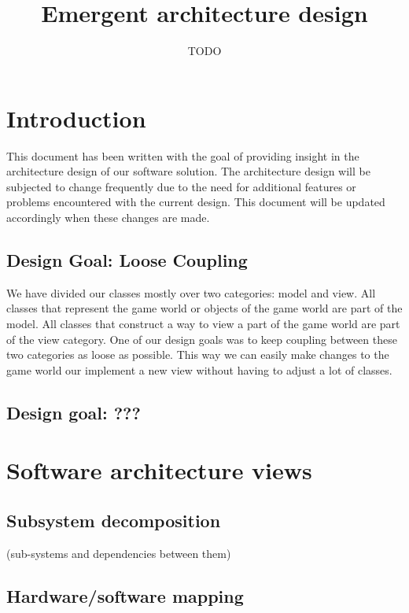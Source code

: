\documentclass{Article}
\begin{document}
\title{Emergent architecture design}
\author{TODO}
\maketitle

\section{Introduction}

This document has been written with the goal of providing insight in the architecture design of our software solution. The architecture design will be subjected to change frequently due to the need for additional features or problems encountered with the current design. This document will be updated accordingly when these changes are made. 
\subsection{Design Goal: Loose Coupling}

We have divided our classes mostly over two categories: model and view. All classes that represent the game world or objects of the game world are part of the model. All classes that construct a way to view a part of the game world are part of the view category. One of our design goals was to keep coupling between these two categories as loose as possible. This way we can easily make changes to the game world our implement a new view without having to adjust a lot of classes.

\subsection{Design goal: ???}


\section{Software architecture views}

\subsection{Subsystem decomposition}

(sub-systems and dependencies between them)

\subsection{Hardware/software mapping}
\end{document}

